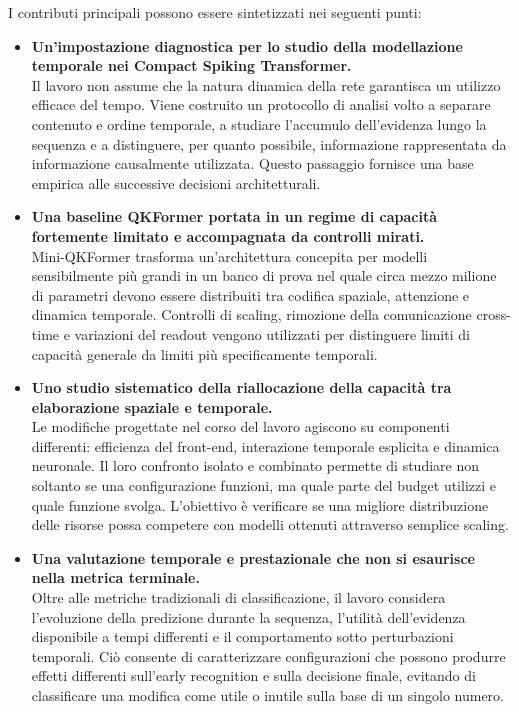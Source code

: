 I contributi principali possono essere sintetizzati nei seguenti punti:
\begin{itemize}
    \item \textbf{Un'impostazione diagnostica per lo studio della modellazione temporale nei Compact Spiking Transformer.} \\
    Il lavoro non assume che la natura dinamica della rete garantisca un utilizzo efficace del tempo. Viene costruito un protocollo di analisi volto a separare contenuto e ordine temporale, a studiare l'accumulo dell'evidenza lungo la sequenza e a distinguere, per quanto possibile, informazione rappresentata da informazione causalmente utilizzata. Questo passaggio fornisce una base empirica alle successive decisioni architetturali.

    \item \textbf{Una baseline QKFormer portata in un regime di capacità fortemente limitato e accompagnata da controlli mirati.} \\
    Mini-QKFormer trasforma un'architettura concepita per modelli sensibilmente più grandi in un banco di prova nel quale circa mezzo milione di parametri devono essere distribuiti tra codifica spaziale, attenzione e dinamica temporale. Controlli di scaling, rimozione della comunicazione cross-time e variazioni del readout vengono utilizzati per distinguere limiti di capacità generale da limiti più specificamente temporali.

    \item \textbf{Uno studio sistematico della riallocazione della capacità tra elaborazione spaziale e temporale.} \\
    Le modifiche progettate nel corso del lavoro agiscono su componenti differenti: efficienza del front-end, interazione temporale esplicita e dinamica neuronale. Il loro confronto isolato e combinato permette di studiare non soltanto se una configurazione funzioni, ma quale parte del budget utilizzi e quale funzione svolga. L'obiettivo è verificare se una migliore distribuzione delle risorse possa competere con modelli ottenuti attraverso semplice scaling.

    \item \textbf{Una valutazione temporale e prestazionale che non si esaurisce nella metrica terminale.} \\
    Oltre alle metriche tradizionali di classificazione, il lavoro considera l'evoluzione della predizione durante la sequenza, l'utilità dell'evidenza disponibile a tempi differenti e il comportamento sotto perturbazioni temporali. Ciò consente di caratterizzare configurazioni che possono produrre effetti differenti sull'early recognition e sulla decisione finale, evitando di classificare una modifica come utile o inutile sulla base di un singolo numero.


\end{itemize}
